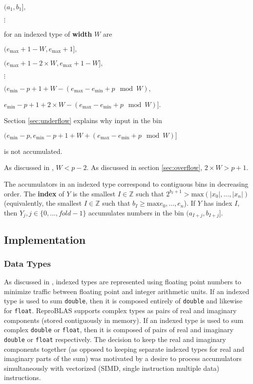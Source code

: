 \documentclass[12pt]{article}
\providecommand{\Z}{\ensuremath{\mathbb{Z}}}
\providecommand{\min}{\ensuremath{\text{min}}}
\providecommand{\max}{\ensuremath{\text{max}}}
\theoremstyle{plain}
\begin{document}
    $(a_1, b_1],$

    $\vdots$

    for an indexed type of \textbf{width} $W$ are

    $(e_{\max} + 1 - W, e_{\max} + 1],$

    $(e_{\max} + 1 - 2\times W, e_{\max} + 1 - W],$

    $\vdots$

    $(e_{\min} - p + 1 + W - (e_{\max} - e_{\min} + p \mod W),$

    \indent \indent $e_{\min} - p + 1 + 2 \times W - (e_{\max} - e_{\min} + p \mod W)]$.

    Section \ref{sec:underflow} explains why input in the bin

    $(e_{\min} - p, e_{\min} - p + 1 + W + (e_{\max} - e_{\min} + p \mod W)]$

    is not accumulated.

    As discussed in \cite{repsum}, $W < p - 2$. As discussed in section \ref{sec:overflow}, $2\times W > p + 1$.

    The accumulators in an indexed type correspond to contiguous bins in decreasing order. The \textbf{index} of $Y$ is the smallest $I \in \Z$ such that $2^{b_I + 1} > \max(|x_0|, ..., |x_n|)$ (equivalently, the smallest $I \in \Z$ such that $b_I \geq \max{e_0, ..., e_n}$). If $Y$ has index $I$, then $Y_j, j \in \{0, ..., fold - 1\}$ accumulates numbers in the bin $(a_{I + j}, b_{I + j}]$.

  \subsection{Implementation}
    \subsubsection{Data Types}
      As discussed in \cite{repsum}, indexed types are represented using floating point numbers to minimize traffic between floating point and integer arithmetic units. If an indexed type is used to sum \verb|double|, then it is composed entirely of \verb|double| and likewise for \verb|float|. ReproBLAS supports complex types as pairs of real and imaginary components (stored contiguously in memory). If an indexed type is used to sum complex \verb|double| or \verb|float|, then it is composed of pairs of real and imaginary \verb|double| or \verb|float| respectively. The decision to keep the real and imaginary components together (as opposed to keeping separate indexed types for real and imaginary parts of the sum) was motivated by a desire to process accumulators simultaneously with vectorized (SIMD, single instruction multiple data) instructions.
\end{document}
